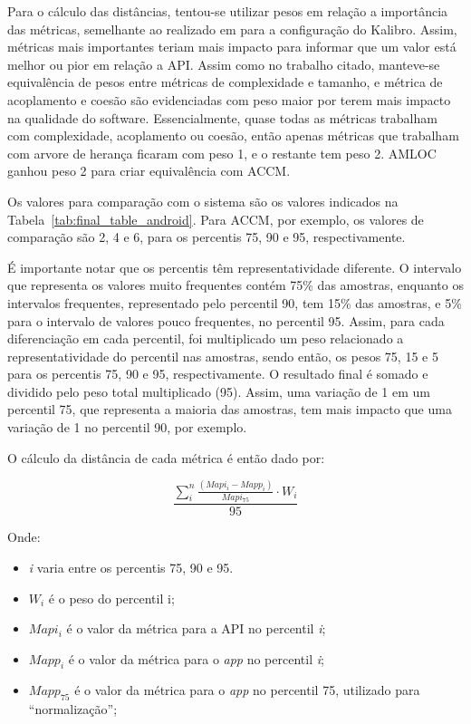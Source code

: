 Para o cálculo das distâncias, tentou-se utilizar pesos em relação a importância das métricas, semelhante ao realizado em  para a configuração do Kalibro. Assim, métricas mais importantes teriam mais impacto para informar que um valor está melhor ou pior em relação a API. Assim como no trabalho citado, manteve-se equivalência de pesos entre métricas de complexidade e tamanho, e métrica de acoplamento e coesão são evidenciadas com peso maior por terem mais impacto na qualidade do software. Essencialmente, quase todas as métricas trabalham com complexidade, acoplamento ou coesão, então apenas métricas que trabalham com arvore de herança ficaram com peso 1, e o restante tem peso 2. AMLOC ganhou peso 2 para criar equivalência com ACCM.

Os valores para comparação com o sistema são os valores indicados na Tabela~\ref{tab:final_table_android}. Para ACCM, por exemplo, os valores de comparação são 2, 4 e 6, para os percentis 75, 90 e 95, respectivamente. 

É importante notar que os percentis têm representatividade diferente. O intervalo que representa os valores muito frequentes contém 75\% das amostras, enquanto os intervalos frequentes, representado pelo percentil 90, tem 15\% das amostras, e 5\% para o intervalo de valores pouco frequentes, no percentil 95. Assim, para cada diferenciação em cada percentil, foi multiplicado um peso relacionado a representatividade do percentil nas amostras, sendo então, os pesos 75, 15 e 5 para os percentis 75, 90 e 95, respectivamente. O resultado final é somado e dividido pelo peso total multiplicado (95). Assim, uma variação de 1 em um percentil 75, que representa a maioria das amostras, tem mais impacto que uma variação de 1 no percentil 90, por exemplo.

O cálculo da distância de cada métrica é então dado por:
\begin{center}
\begin{equation}\label{eq:distancia_metrica}
\displaystyle \frac{\sum_{i}^{n} \frac{(Mapi_i-Mapp_i)}{Mapi_{75}}\cdot W_i}{95}
\end{equation}
\end{center}

Onde:
\begin{itemize}
\item \textit{i} varia entre os percentis 75, 90 e 95. 
\item $W_i$ é o peso do percentil i;
\item $Mapi_i$ é o valor da métrica para a API no percentil \textit{i};
\item $Mapp_i$ é o valor da métrica para o \textit{app} no percentil \textit{i};
\item $Mapp_{75}$ é o valor da métrica para o \textit{app} no percentil 75, utilizado para ``normalização'';
\end{itemize}

